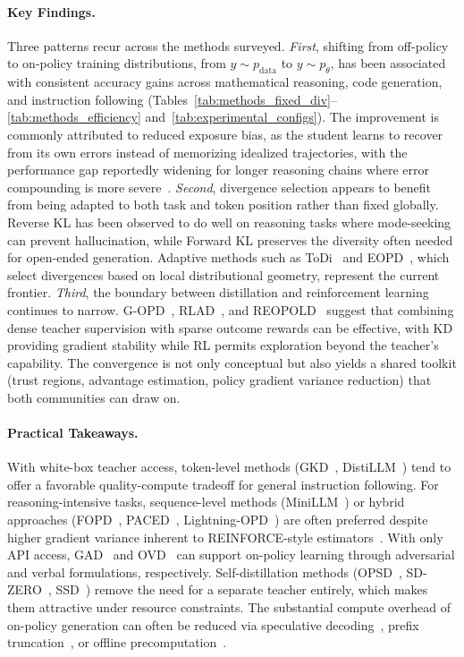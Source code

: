 \documentclass{article} %
\newcommand{\ptheta}{p_\theta}
\newcommand{\pdata}{p_{\mathrm{data}}}
\begin{document}
\paragraph{Key Findings.} Three patterns recur across the methods surveyed. \emph{First}, shifting from off-policy to on-policy training distributions, from $y \sim \pdata$ to $y \sim \ptheta$, has been associated with consistent accuracy gains across mathematical reasoning, code generation, and instruction following (Tables~\ref{tab:methods_fixed_div}--\ref{tab:methods_efficiency} and~\ref{tab:experimental_configs}). The improvement is commonly attributed to reduced exposure bias, as the student learns to recover from its own errors instead of memorizing idealized trajectories, with the performance gap reportedly widening for longer reasoning chains where error compounding is more severe~\citep{2306.08543,2306.13649}. \emph{Second}, divergence selection appears to benefit from being adapted to both task and token position rather than fixed globally. Reverse KL has been observed to do well on reasoning tasks where mode-seeking can prevent hallucination, while Forward KL preserves the diversity often needed for open-ended generation. Adaptive methods such as ToDi~\citep{2505.16297} and EOPD~\citep{2603.07079}, which select divergences based on local distributional geometry, represent the current frontier. \emph{Third}, the boundary between distillation and reinforcement learning continues to narrow. G-OPD~\citep{2602.12125}, RLAD~\citep{2602.22495}, and REOPOLD~\citep{2603.11137} suggest that combining dense teacher supervision with sparse outcome rewards can be effective, with KD providing gradient stability while RL permits exploration beyond the teacher's capability. The convergence is not only conceptual but also yields a shared toolkit (trust regions, advantage estimation, policy gradient variance reduction) that both communities can draw on.

\paragraph{Practical Takeaways.} With white-box teacher access, token-level methods (GKD~\citep{2306.13649}, DistiLLM~\citep{2402.03898}) tend to offer a favorable quality-compute tradeoff for general instruction following. For reasoning-intensive tasks, sequence-level methods (MiniLLM~\citep{2306.08543}) or hybrid approaches (FOPD~\citep{2602.15260}, PACED~\citep{2603.11178}, Lightning-OPD~\citep{2604.13010}) are often preferred despite higher gradient variance inherent to REINFORCE-style estimators~\citep{2306.08543}. With only API access, GAD~\citep{2511.10643} and OVD~\citep{2601.21968} can support on-policy learning through adversarial and verbal formulations, respectively. Self-distillation methods (OPSD~\citep{2601.18734}, SD-ZERO~\citep{2604.12002}, SSD~\citep{2604.01193}) remove the need for a separate teacher entirely, which makes them attractive under resource constraints. The substantial compute overhead of on-policy generation can often be reduced via speculative decoding~\citep{2410.11325}, prefix truncation~\citep{2602.15260}, or offline precomputation~\citep{2604.13010}.
\end{document}
